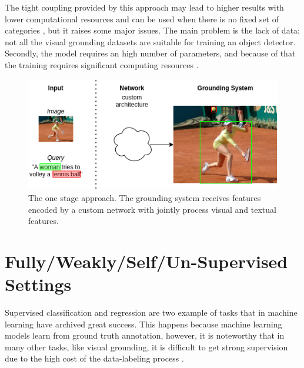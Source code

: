 The tight coupling provided by this approach may lead to higher
results with lower computational resources \cite{yang2019fast} and can
be used when there is no fixed set of categories \cite{sadhu2019zero},
but it raises some major issues. The main problem is the lack of data:
not all the visual grounding datasets are suitable for training an
object detector. Secondly, the model requires an high number of
parameters, and because of that the training requires significant
computing resources \cite{rigoni2021better}.

\begin{figure}
  \centering
  \includegraphics[width=.8\textwidth]{figures/one-stage-approach.png}
  \caption[One stage approach]{
    The one stage approach. The grounding system receives features
    encoded by a custom network with jointly process visual and
    textual features.
  }
  \label{fig:one-stage-approach}
\end{figure}

\section{Fully/Weakly/Self/Un-Supervised Settings}
\label{sec:supervision}

Supervised classification and regression are two example of tasks that
in machine learning have archived great success. This happens because
machine learning models learn from ground truth annotation, however,
it is noteworthy that in many other tasks, like visual grounding, it
is difficult to get strong supervision due to the high cost of the
data-labeling process \cite{zhou2018brief}.

